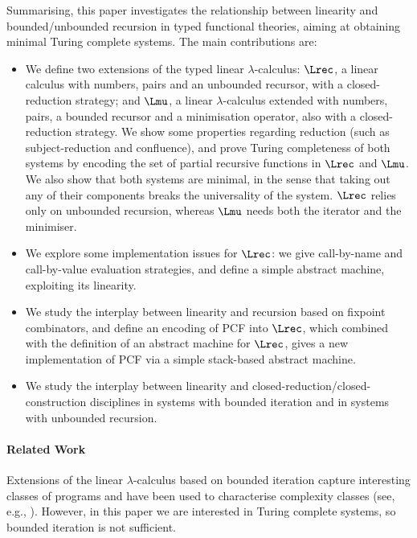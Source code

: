 \documentclass{article}
\begin{document}
Summarising, this paper investigates the relationship between linearity 
and bounded/unbounded recursion in typed functional theories, aiming at
obtaining minimal Turing complete systems. The main contributions are:

\begin{itemize}
\item We define two extensions of the typed linear $\lambda$-calculus:
  $\Lrec$, a linear calculus with numbers, pairs and an unbounded
  recursor, with a closed-reduction strategy; and $\Lmu$, a linear
  $\lambda$-calculus extended with numbers, pairs, a bounded recursor
  and a minimisation operator, also with a closed-reduction
  strategy. We show some properties regarding reduction (such as
  subject-reduction and confluence), and prove Turing completeness of
  both systems by encoding the set of partial recursive functions in
  $\Lrec$ and $\Lmu$. We also show that both systems are minimal, in
  the sense that taking out any of their components breaks the
  universality of the system. $\Lrec$ relies only on unbounded
  recursion, whereas $\Lmu$ needs both the iterator and the minimiser.

\item We explore some implementation issues for $\Lrec$: we give
call-by-name and call-by-value evaluation strategies, and define a
simple abstract machine, exploiting its linearity.

\item We study the interplay between linearity and recursion based on
fixpoint combinators, and define an encoding of PCF into $\Lrec$,
which combined with the definition of an abstract machine for $\Lrec$,
gives a new implementation of PCF via a simple stack-based abstract
machine.

\item We study the interplay between linearity and
closed-reduction/closed-construction disciplines in systems with
bounded iteration and in systems with unbounded recursion.
\end{itemize}

\paragraph{Related Work}
Extensions of the linear $\lambda$-calculus based on bounded iteration
capture interesting classes of programs and have been used to
characterise complexity classes (see, e.g.,
\cite{G98,GirardJY:boull,AR02,BM04,H99,L04,T01}). However, in this
paper we are interested in Turing complete systems, so bounded
iteration is not sufficient.
\end{document}

